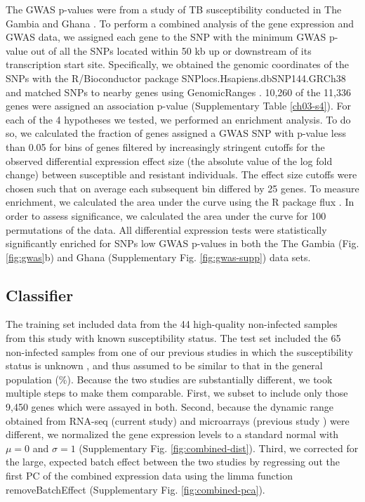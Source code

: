 The GWAS p-values were from a study of TB susceptibility conducted in
The Gambia and Ghana \citep{Thye2010}. To perform a combined analysis
of the gene expression and GWAS data, we assigned each gene to the SNP
with the minimum GWAS p-value out of all the SNPs located within 50 kb
up or downstream of its transcription start site. Specifically, we
obtained the genomic coordinates of the SNPs with the R/Bioconductor
\citep{Huber2015} package SNPlocs.Hsapiens.dbSNP144.GRCh38 and matched
SNPs to nearby genes using GenomicRanges \citep{Lawrence2013}. 10,260
of the 11,336 genes were assigned an association p-value
(Supplementary Table \ref{ch03-s4}). For each of the 4 hypotheses we
tested, we performed an enrichment analysis. To do so, we calculated
the fraction of genes assigned a GWAS SNP with p-value less than 0.05
for bins of genes filtered by increasingly stringent cutoffs for the
observed differential expression effect size (the absolute value of
the log fold change) between susceptible and resistant
individuals. The effect size cutoffs were chosen such that on average
each subsequent bin differed by 25 genes. To measure enrichment, we
calculated the area under the curve using the R package flux
\citep{Jurasinski2014}. In order to assess significance, we calculated
the area under the curve for 100 permutations of the data. All
differential expression tests were statistically significantly
enriched for SNPs low GWAS p-values in both the The Gambia
(Fig. \ref{fig:gwas}b) and Ghana (Supplementary
Fig. \ref{fig:gwas-supp}) data sets.
\subsection{Classifier}

The training set included data from the 44 high-quality non-infected
samples from this study with known susceptibility status. The test set
included the 65 non-infected samples from one of our previous studies
in which the susceptibility status is unknown \citep{Barreiro2012},
and thus assumed to be similar to that in the general population
(\%). Because the two studies are substantially different,
we took multiple steps to make them comparable. First, we subset to
include only those 9,450 genes which were assayed in both.  Second,
because the dynamic range obtained from RNA-seq (current study) and
microarrays (previous study \citep{Barreiro2012}) were different, we
normalized the gene expression levels to a standard normal with $\mu =
0$ and $\sigma = 1$ (Supplementary Fig.
\ref{fig:combined-dist}). Third, we corrected for the large, expected
batch effect between the two studies by regressing out the first PC of
the combined expression data using the limma function
removeBatchEffect \citep{Ritchie2015} (Supplementary Fig.
\ref{fig:combined-pca}).

